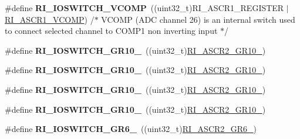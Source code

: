 \begin{DoxyCompactItemize}
\item 
\hypertarget{group___r_i___i_o_switch_gadb39f8d408a9e8a7031e417dd1de65d1}{\#define {\bfseries R\-I\-\_\-\-I\-O\-S\-W\-I\-T\-C\-H\-\_\-\-V\-C\-O\-M\-P}~((uint32\-\_\-t)R\-I\-\_\-\-A\-S\-C\-R1\-\_\-\-R\-E\-G\-I\-S\-T\-E\-R $\vert$ \hyperlink{group___peripheral___registers___bits___definition_gae5638ca72d0a62251410161b71037aa7}{R\-I\-\_\-\-A\-S\-C\-R1\-\_\-\-V\-C\-O\-M\-P}) /$\ast$ V\-C\-O\-M\-P (A\-D\-C channel 26) is an internal switch used to connect selected channel to C\-O\-M\-P1 non inverting input $\ast$/}\label{group___r_i___i_o_switch_gadb39f8d408a9e8a7031e417dd1de65d1}

\item 
\hypertarget{group___r_i___i_o_switch_ga0f2ae2e2a8c53d957709c9e78dc08f31}{\#define {\bfseries R\-I\-\_\-\-I\-O\-S\-W\-I\-T\-C\-H\-\_\-\-G\-R10\-\_}~((uint32\-\_\-t)\hyperlink{group___peripheral___registers___bits___definition_ga107731f14487352ff843d3c1aedd4640}{R\-I\-\_\-\-A\-S\-C\-R2\-\_\-\-G\-R10\-\_})}\label{group___r_i___i_o_switch_ga0f2ae2e2a8c53d957709c9e78dc08f31}

\item 
\hypertarget{group___r_i___i_o_switch_gad0baab5202a246bf37a1700e6a28d3f7}{\#define {\bfseries R\-I\-\_\-\-I\-O\-S\-W\-I\-T\-C\-H\-\_\-\-G\-R10\-\_}~((uint32\-\_\-t)\hyperlink{group___peripheral___registers___bits___definition_ga66c71861e9ad11b44150b93505988b51}{R\-I\-\_\-\-A\-S\-C\-R2\-\_\-\-G\-R10\-\_})}\label{group___r_i___i_o_switch_gad0baab5202a246bf37a1700e6a28d3f7}

\item 
\hypertarget{group___r_i___i_o_switch_ga173ba05e20df8537bcf8cd29dd8ae764}{\#define {\bfseries R\-I\-\_\-\-I\-O\-S\-W\-I\-T\-C\-H\-\_\-\-G\-R10\-\_}~((uint32\-\_\-t)\hyperlink{group___peripheral___registers___bits___definition_gad915c71a6ca56cb9ed8107a4f3d55a22}{R\-I\-\_\-\-A\-S\-C\-R2\-\_\-\-G\-R10\-\_})}\label{group___r_i___i_o_switch_ga173ba05e20df8537bcf8cd29dd8ae764}

\item 
\hypertarget{group___r_i___i_o_switch_ga291da0aa5c5e5513a9984cae8431f721}{\#define {\bfseries R\-I\-\_\-\-I\-O\-S\-W\-I\-T\-C\-H\-\_\-\-G\-R10\-\_}~((uint32\-\_\-t)\hyperlink{group___peripheral___registers___bits___definition_ga77d08e89c26c8fd3948f4b1ffc821fb3}{R\-I\-\_\-\-A\-S\-C\-R2\-\_\-\-G\-R10\-\_})}\label{group___r_i___i_o_switch_ga291da0aa5c5e5513a9984cae8431f721}

\item 
\hypertarget{group___r_i___i_o_switch_ga47c4ac8cabbecfc5c8ed452d28f2628f}{\#define {\bfseries R\-I\-\_\-\-I\-O\-S\-W\-I\-T\-C\-H\-\_\-\-G\-R6\-\_}~((uint32\-\_\-t)\hyperlink{group___peripheral___registers___bits___definition_ga68a0445518cab86238c19ec70b1a7f82}{R\-I\-\_\-\-A\-S\-C\-R2\-\_\-\-G\-R6\-\_})}\label{group___r_i___i_o_switch_ga47c4ac8cabbecfc5c8ed452d28f2628f}


\end{DoxyCompactItemize}
